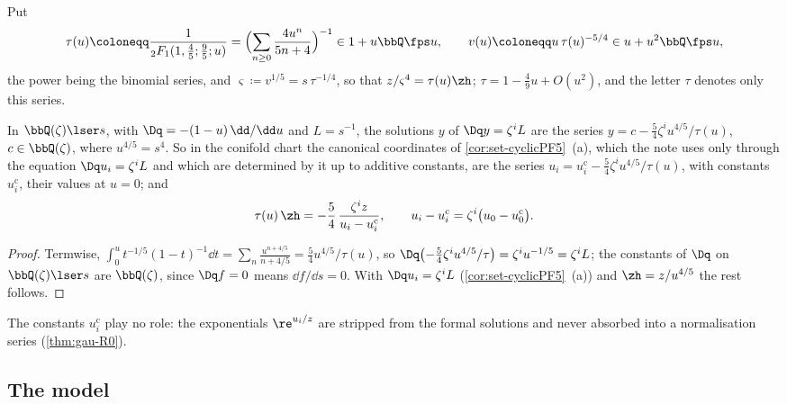 \begin{defn}
\label{def:set-tau}
Put
\[
\tau(u)\coloneqq\frac1{{}_2F_1(1,\frac45;\frac95;u)}=\Bigl(\sum_{n\geq0}\frac{4u^n}{5n+4}\Bigr)^{-1}\in1+u\bbQ\fps u,\qquad v(u)\coloneqq u\,\tau(u)^{-5/4}\in u+u^2\bbQ\fps u,
\]
the power being the binomial series, and $\varsigma\coloneqq v^{1/5}=s\,\tau^{-1/4}$, so that $z/\varsigma^4=\tau(u)\zh$; $\tau=1-\frac49u+O(u^2)$, and the letter $\tau$ denotes only this series.
\end{defn}

\begin{lem}
\label{lem:set-canon}
In $\bbQ(\zeta)\lser s$, with $\Dq=-(1-u)\,\dd/\dd u$ and $L=s^{-1}$, the solutions $y$ of $\Dq y=\zeta^iL$ are the series $y=c-\frac54\zeta^iu^{4/5}/\tau(u)$, $c\in\bbQ(\zeta)$, where $u^{4/5}=s^4$. So in the conifold chart the canonical coordinates of \cref{cor:set-cyclicPF5}~(a), which the note uses only through the equation $\Dq u_i=\zeta^iL$ and which are determined by it up to additive constants, are the series $u_i=u_i^{\mathrm c}-\frac54\zeta^iu^{4/5}/\tau(u)$, with constants $u_i^{\mathrm c}$, their values at $u=0$; and
\[
\tau(u)\,\zh=-\frac54\,\frac{\zeta^iz}{u_i-u_i^{\mathrm c}},\qquad u_i-u_i^{\mathrm c}=\zeta^i\bigl(u_0-u_0^{\mathrm c}\bigr).
\]
\end{lem}

\begin{proof}
Termwise, $\int_0^ut^{-1/5}(1-t)^{-1}\dd t=\sum_n\frac{u^{n+4/5}}{n+4/5}=\frac54u^{4/5}/\tau(u)$, so $\Dq\bigl(-\frac54\zeta^iu^{4/5}/\tau\bigr)=\zeta^iu^{-1/5}=\zeta^iL$; the constants of $\Dq$ on $\bbQ(\zeta)\lser s$ are $\bbQ(\zeta)$, since $\Dq f=0$ means $\dd f/\dd s=0$. With $\Dq u_i=\zeta^iL$ (\cref{cor:set-cyclicPF5}~(a)) and $\zh=z/u^{4/5}$ the rest follows.
\end{proof}

The constants $u_i^{\mathrm c}$ play no role: the exponentials $\re^{u_i/z}$ are stripped from the formal solutions and never absorbed into a normalisation series (\cref{thm:gau-R0}).

\subsection{The model}
\label{sec:set-model}

